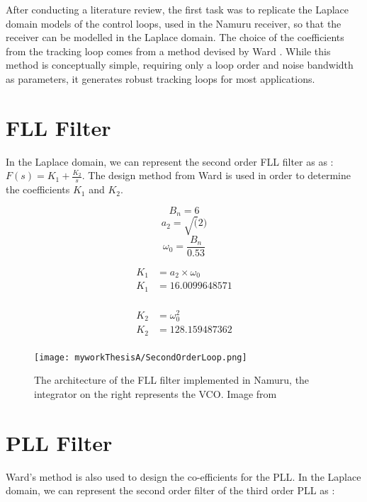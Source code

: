 After conducting a literature review, the first task was to replicate the Laplace domain models of the control loops, used in the Namuru receiver, so that the receiver can be modelled in the Laplace domain. The choice of the coefficients from the tracking loop comes from a method devised by Ward \cite{Ward}. While this method is conceptually simple, requiring only a loop order and noise bandwidth as parameters, it generates robust tracking loops for most applications. 

\section{\ac{FLL} Filter}
In the Laplace domain, we can represent the second order \ac{FLL} filter as as :  $F(s) = K_1 + \frac{K_2}{s}$. The design method from Ward \cite{Ward} is used in order to determine the coefficients $K_1$ and $K_2$.  

$$B_n = 6$$
$$a_2 = \sqrt(2)$$
$$\omega_{0}=\frac{B_n}{0.53}$$

\begin{equation} \label{eq1}
\begin{split}
K_1 & = a_2 \times \omega_{0}\\
K_1 & = 16.0099648571\\
\end{split}
\end{equation}

\begin{equation} \label{eq2}
\begin{split}
K_2 & = \omega_{0}^2\\
K_2 & = 128.159487362\\
\end{split}
\end{equation}

\begin{figure}[!htb] 
    \centering
    \texttt{[image: myworkThesisA/SecondOrderLoop.png]} 
    \caption{The architecture of the \ac{FLL} filter implemented in Namuru, the integrator on the right represents the \ac{VCO}. Image from \cite{Kaplan}}
    \label{fig:SecondOrderLoop}
\end{figure}


\section{\ac{PLL} Filter}
Ward's method is also used to design the co-efficients for the \ac{PLL}. In the Laplace domain, we can represent the second order filter  of the third order \ac{PLL} as : 


